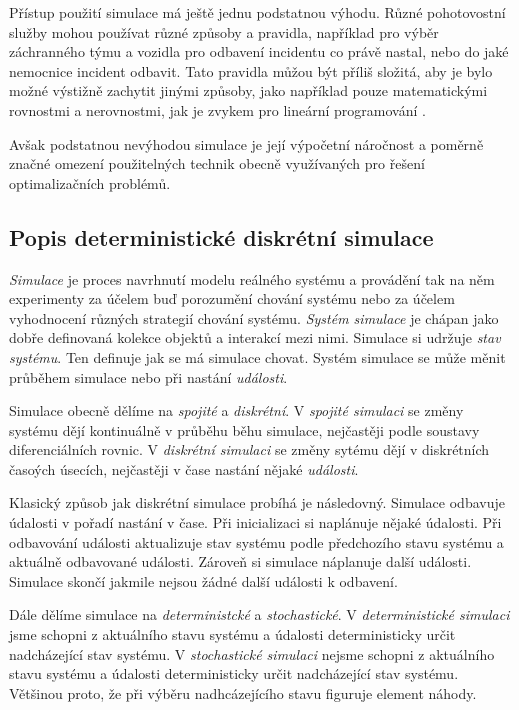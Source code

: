 Přístup použití simulace má ještě jednu podstatnou výhodu.
Různé pohotovostní služby mohou používat různé způsoby a pravidla, například pro výběr záchranného týmu a vozidla pro odbavení incidentu co právě nastal, nebo do jaké nemocnice incident odbavit.
Tato pravidla můžou být příliš složitá, aby je bylo možné výstižně zachytit jinými způsoby, jako například pouze matematickými rovnostmi a nerovnostmi, jak je zvykem pro lineární programování \cite{LP}.

Avšak podstatnou nevýhodou simulace je její výpočetní náročnost a poměrně značné omezení použitelných technik obecně využívaných pro řešení optimalizačních problémů.

\subsection{Popis deterministické diskrétní simulace}

\textit{Simulace} je proces navrhnutí modelu reálného systému a provádění tak na něm experimenty za účelem buď porozumění chování systému
nebo za účelem vyhodnocení různých strategií chování systému.
\textit{Systém simulace} je chápan jako dobře definovaná kolekce objektů a interakcí mezi nimi.
Simulace si udržuje \textit{stav systému}. Ten definuje jak se má simulace chovat.
Systém simulace se může měnit průběhem simulace nebo při nastání \textit{události}.

Simulace obecně dělíme na \textit{spojité} a \textit{diskrétní}.
V \textit{spojité simulaci} se změny systému dějí kontinuálně v průběhu běhu simulace, nejčastěji podle soustavy diferenciálních rovnic.
V \textit{diskrétní simulaci} se změny sytému dějí v diskrétních časoých úsecích, nejčastěji v čase nastání nějaké \textit{události}.

Klasický způsob jak diskrétní simulace probíhá je následovný.
Simulace odbavuje údalosti v pořadí nastání v čase.
Při inicializaci si naplánuje nějaké údalosti.
Při odbavování události aktualizuje stav systému podle předchozího stavu systému a aktuálně odbavované události. Zároveň si simulace náplanuje další události. 
Simulace skončí jakmile nejsou žádné další události k odbavení.

Dále dělíme simulace na \textit{deterministcké} a \textit{stochastické}.
V \textit{deterministické simulaci} jsme schopni z aktuálního stavu systému a údalosti deterministicky určit nadcházející stav systému.
V \textit{stochastické simulaci} nejsme schopni z aktuálního stavu systému a údalosti deterministicky určit nadcházející stav systému.
Většinou proto, že při výběru nadhcázejícího stavu figuruje element náhody.
\cite{SimulaceBook}

